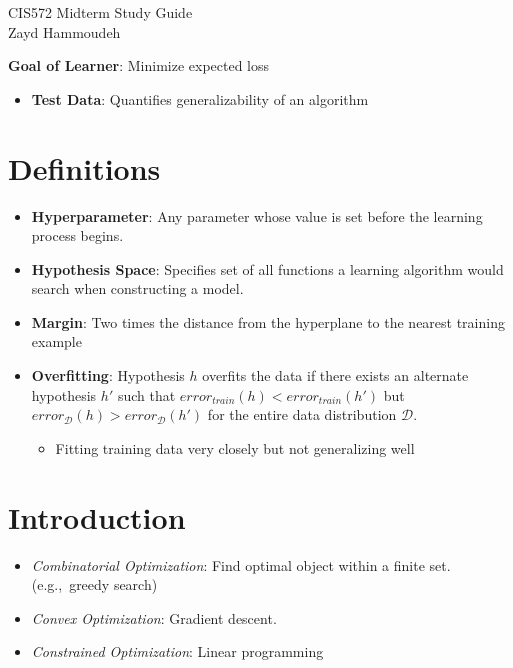 \documentclass[10pt]{article}
\newcommand{\colortext}[2]{{\color{#1} #2}}
\newcommand{\red}[1]{\colortext{red}{#1}}
\begin{document}
\begin{center}
  {\Large CIS572 Midterm Study Guide} \\\vspace{6pt}
  Zayd Hammoudeh
\end{center}


\begin{multicols}{3}
\textbf{Goal of Learner}: Minimize \red{expected loss}

\begin{itemize}
  \item \textbf{Test Data}: Quantifies generalizability of an algorithm
\end{itemize}

  \section*{Definitions}

  \begin{itemize}
    \item \textbf{Hyperparameter}: Any parameter whose value is set before the learning process begins.
    \item \textbf{Hypothesis Space}: Specifies set of all functions a learning algorithm would search when constructing a model.
    \item \textbf{Margin}: \red{Two} times the distance from the hyperplane to the nearest training example
    \item \textbf{Overfitting}: Hypothesis $h$ overfits the data if there exists an alternate hypothesis $h'$ such that $error_{train}(h) < error_{train}(h')$ but $error_{\mathcal{D}}(h) > error_{\mathcal{D}}(h')$ for the entire data distribution $\mathcal{D}$.
     \begin{itemize}
       \item Fitting training data very closely but not generalizing well
     \end{itemize}
  \end{itemize}

  \section{Introduction}

  \begin{itemize}
    \item \textit{Combinatorial Optimization}: Find optimal object within a finite set. (e.g.,~greedy search)
    \item \textit{Convex Optimization}: Gradient descent.
    \item \textit{Constrained Optimization}: Linear programming
  \end{itemize}


\end{multicols}
\end{document}
